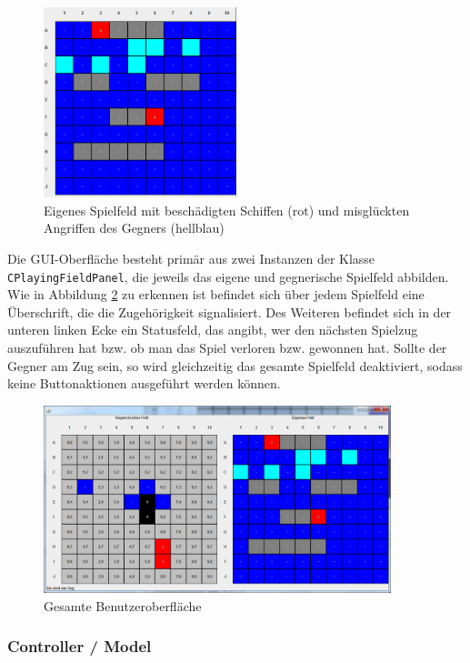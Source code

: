 \begin{figure}[H]
  \centering
  \includegraphics[width=0.5\textwidth]{images/JavaOwnPlayingFieldPanel.png}
  \caption{Eigenes Spielfeld mit beschädigten Schiffen (rot) und misglückten Angriffen des Gegners (hellblau)}
  \label{fig:EigenesSpielfeldpanel}
\end{figure}

Die GUI-Oberfläche besteht primär aus zwei Instanzen der Klasse \texttt{CPlayingFieldPanel}, die jeweils das eigene und gegnerische Spielfeld abbilden.
Wie in Abbildung \ref{fig:GUI} zu erkennen ist befindet sich über jedem Spielfeld eine Überschrift, die die Zugehörigkeit signalisiert.
Des Weiteren befindet sich in der unteren linken Ecke ein Statusfeld, das angibt, wer den nächsten Spielzug auszuführen hat bzw. ob man das Spiel verloren bzw. gewonnen hat.
Sollte der Gegner am Zug sein, so wird gleichzeitig das gesamte Spielfeld deaktiviert, sodass keine Buttonaktionen ausgeführt werden können.

\begin{figure}[H]
  \centering
  \includegraphics[width=0.9\textwidth]{images/JavaClientGUI.png}
  \caption{Gesamte Benutzeroberfläche}
  \label{fig:GUI}
\end{figure}

\subsubsection{Controller / Model}


